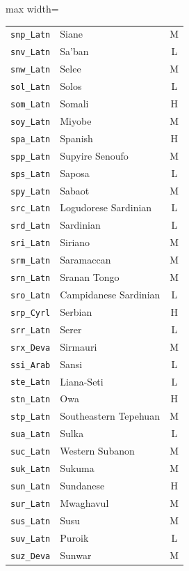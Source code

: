 {\begin{adjustbox}{max width=\textwidth}
\begin{tabular}{llc}
        \texttt{snp\_Latn} & Siane & M \\
        \texttt{snv\_Latn} & Sa'ban & L \\
        \texttt{snw\_Latn} & Selee & M \\
        \texttt{sol\_Latn} & Solos & L \\
        \texttt{som\_Latn} & Somali & H \\
        \texttt{soy\_Latn} & Miyobe & M \\
        \texttt{spa\_Latn} & Spanish & H \\
        \texttt{spp\_Latn} & Supyire Senoufo & M \\
        \texttt{sps\_Latn} & Saposa & L \\
        \texttt{spy\_Latn} & Sabaot & M \\
        \texttt{src\_Latn} & Logudorese Sardinian & L \\
        \texttt{srd\_Latn} & Sardinian & L \\
        \texttt{sri\_Latn} & Siriano & M \\
        \texttt{srm\_Latn} & Saramaccan & M \\
        \texttt{srn\_Latn} & Sranan Tongo & M \\
        \texttt{sro\_Latn} & Campidanese Sardinian & L \\
        \texttt{srp\_Cyrl} & Serbian & H \\
        \texttt{srr\_Latn} & Serer & L \\
        \texttt{srx\_Deva} & Sirmauri & M \\
        \texttt{ssi\_Arab} & Sansi & L \\
        \texttt{ste\_Latn} & Liana-Seti & L \\
        \texttt{stn\_Latn} & Owa & H \\
        \texttt{stp\_Latn} & Southeastern Tepehuan & M \\
        \texttt{sua\_Latn} & Sulka & L \\
        \texttt{suc\_Latn} & Western Subanon & M \\
        \texttt{suk\_Latn} & Sukuma & M \\
        \texttt{sun\_Latn} & Sundanese & H \\
        \texttt{sur\_Latn} & Mwaghavul & M \\
        \texttt{sus\_Latn} & Susu & M \\
        \texttt{suv\_Latn} & Puroik & L \\
        \texttt{suz\_Deva} & Sunwar & M \\

\end{tabular}
\end{adjustbox}}
